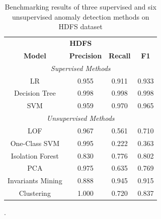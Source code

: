 \begin{table}[h]
\centering
\begin{tabular}{@{}cccc@{}}
\toprule
\multicolumn{4}{c}{\textbf{HDFS}} \\ 
\textbf{Model}    & \textbf{Precision} & \textbf{Recall} & \textbf{F1} \\  \toprule \midrule
\multicolumn{4}{c}{\textit{Supervised Methods}}                        \\ \midrule
LR                & 0.955              & 0.911           & 0.933       \\
Decision Tree     & 0.998              & 0.998           & 0.998       \\
SVM               & 0.959              & 0.970           & 0.965       \\ \midrule
\multicolumn{4}{c}{\textit{Unsupervised Methods}}                      \\ \midrule
LOF      & 0.967              & 0.561           & 0.710       \\
One-Class SVM     & 0.995              & 0.222           & 0.363       \\
Isolation Forest  & 0.830              & 0.776           & 0.802       \\
PCA               & 0.975              & 0.635           & 0.769       \\
Invariants Mining & 0.888              & 0.945           & 0.915       \\
Clustering        & 1.000              & 0.720           & 0.837       \\ \bottomrule
\end{tabular}
\caption{Benchmarking results of three supervised and six unsupervised anomaly detection methods on HDFS dataset \cite{he2016}}.
\label{table:loglizer}
\end{table}


